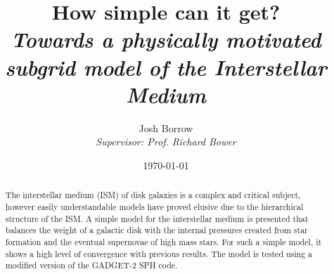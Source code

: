 \begin{titlepage}

\vspace{10mm}
\author{Josh Borrow\\
\emph{Supervisor: Prof. Richard Bower}}
\date{\today}
\title{How simple can it get? \\
\vspace{4mm}
\large \emph{Towards a physically motivated subgrid model of the Interstellar Medium}}
\maketitle
\vspace{10mm}
\begin{abstract}
The interstellar medium (ISM) of disk galaxies is a complex and critical subject, however easily understandable models have proved elusive due to the hierarchical structure of the ISM. A simple model for the interstellar medium is presented that balances the weight of a galactic disk with the internal pressures created from star formation and the eventual supernovae of high mass stars. For such a simple model, it shows a high level of convergence with previous results. The model is tested using a modified version of the GADGET-2 SPH code.
\end{abstract}
\end{titlepage}
